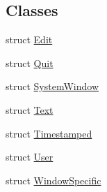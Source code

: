 \subsection*{Classes}
\begin{DoxyCompactItemize}
\item 
struct \mbox{\hyperlink{structrolmodl_1_1button__state_1_1hat_state_1_1event_1_1_edit}{Edit}}
\item 
struct \mbox{\hyperlink{structrolmodl_1_1button__state_1_1hat_state_1_1event_1_1_quit}{Quit}}
\item 
struct \mbox{\hyperlink{structrolmodl_1_1button__state_1_1hat_state_1_1event_1_1_system_window}{System\+Window}}
\item 
struct \mbox{\hyperlink{structrolmodl_1_1button__state_1_1hat_state_1_1event_1_1_text}{Text}}
\item 
struct \mbox{\hyperlink{structrolmodl_1_1button__state_1_1hat_state_1_1event_1_1_timestamped}{Timestamped}}
\item 
struct \mbox{\hyperlink{structrolmodl_1_1button__state_1_1hat_state_1_1event_1_1_user}{User}}
\item 
struct \mbox{\hyperlink{structrolmodl_1_1button__state_1_1hat_state_1_1event_1_1_window_specific}{Window\+Specific}}
\end{DoxyCompactItemize}
